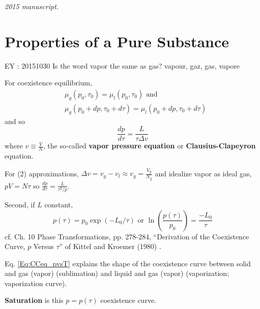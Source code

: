 \noindent\textit{2015 manuscript.}

\cite{CBorgnakkeRSonntag2012}


\section{Properties of a Pure Substance}

EY : 20151030 Is the word vapor the same as gas?  vapour, gaz, gas, vapore

For coexistence equilibrium, 
\[
\begin{aligned}
  & \mu_g(p_0,\tau_0) = \mu_l(p_0,\tau_0) \text{ and } \\ 
  & \mu_g(p_0 + dp, \tau_0+d\tau) = \mu_l(p_0 + dp, \tau_0+d\tau)
\end{aligned}
\]
and so 
\begin{equation}
  \frac{dp}{d\tau} = \frac{L}{\tau \Delta v}
\end{equation}
where $v\equiv \frac{V}{N}$, the so-called \textbf{vapor pressure equation} or \textbf{Clausius-Clapeyron} equation.  

For (2) approximations, $\Delta v = v_g - v_l \approx v_g = \frac{V_g}{N_g}$ and idealize vapor as ideal gas, $pV = N\tau$ so $\frac{dp}{d\tau} = \frac{L}{\tau^2/p}$.  

Second, if $L$ constant, 
\begin{equation}\label{Eq:CCeq_pvsT}
  p(\tau) = p_0 \exp{ (-L_0/\tau)} \text{ or } \ln{ \left( \frac{p(\tau)}{p_0} \right) } = \frac{-L_0}{\tau}
\end{equation}
cf. Ch. 10 Phase Transformations, pp. 278-284, ``Derivation of the Coexistence Curve, $p$ Versus $\tau$'' of Kittel and Kroemer (1980) \cite{CKittelHKroemer1980}.  

Eq. \ref{Eq:CCeq_pvsT} explains the shape of the coexistence curve between solid and gas (vapor) (sublimation) and liquid and gas (vapor) (vaporization; vaporization curve).  

\textbf{Saturation} is this $p=p(\tau)$ coexistence curve.  


